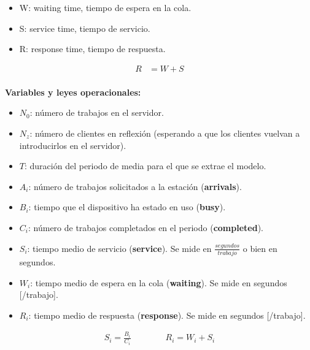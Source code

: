 \documentclass[a4paper,12pt]{article}
\begin{document}
\begin{itemize}
    \item W: waiting time, tiempo de espera en la cola.
    \item S: service time, tiempo de servicio.
    \item R: response time, tiempo de respuesta.
\end{itemize}

\begin{tcolorbox}[colback=yellow!5!white, colframe=yellow!75!black]
    \begin{align*}
        R &= W + S \\
    \end{align*}
\end{tcolorbox}

\textbf{Variables y leyes operacionales:}

\begin{itemize}
    \item $N_0$: número de trabajos en el servidor.
    \item $N_z$: número de clientes en reflexión (esperando a que los clientes vuelvan a introducirlos en el servidor).
    \item $T$: duración del periodo de media para el que se extrae el modelo.
    \item $A_i$: número de trabajos solicitados a la estación (\textbf{arrivals}).
    \item $B_i$: tiempo que el dispositivo ha estado en uso (\textbf{busy}).
    \item $C_i$: número de trabajos completados en el periodo (\textbf{completed}).
    \item $S_i$: tiempo medio de servicio (\textbf{service}). Se mide en $\frac{segundos}{trabajo}$ o bien en segundos.
    \item $W_i$: tiempo medio de espera en la cola (\textbf{waiting}). Se mide en segundos [/trabajo].
    \item $R_i$: tiempo medio de respuesta (\textbf{response}). Se mide en segundos [/trabajo].


\end{itemize}

\begin{tcolorbox}[colback=yellow!5!white, colframe=yellow!75!black]
    \begin{align*}
        S_i = \frac{B_i}{C_i} \quad \quad \quad \quad R_i = W_i + S_i
    \end{align*}
\end{tcolorbox}
\end{document}
